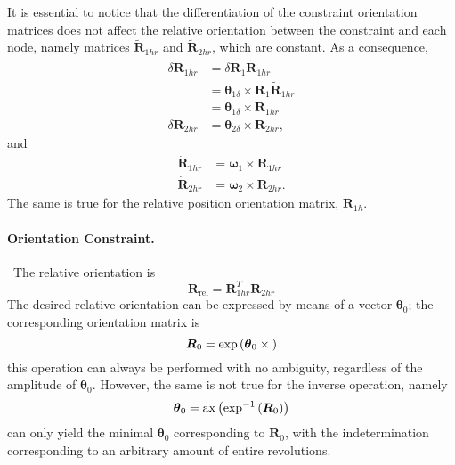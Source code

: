\documentclass[10pt,dvips,fleqn,subeqn]{report}
\newcommand{\T}[1]{\boldsymbol{#1}}
\begin{document}
It is essential to notice that the differentiation of the constraint
orientation matrices does not affect the relative orientation between
the constraint and each node, namely matrices $\tilde{\T{R}}_{1hr}$
and $\tilde{\T{R}}_{2hr}$, which are constant.
As a consequence,
\begin{align}
	\delta\T{R}_{1hr}
		&= \delta\T{R}_1 \tilde{\T{R}}_{1hr} \nonumber \\
		&= \T{\theta}_{1\delta} \times \T{R}_1 \tilde{\T{R}}_{1hr} \nonumber \\
		&= \T{\theta}_{1\delta}\times \T{R}_{1hr} \\
	\delta\T{R}_{2hr} &= \T{\theta}_{2\delta}\times \T{R}_{2hr} ,
\end{align}
and
\begin{align}
	\dot{\T{R}}_{1hr} &= \T{\omega}_1 \times \T{R}_{1hr} \\
	\dot{\T{R}}_{2hr} &= \T{\omega}_2 \times \T{R}_{2hr} .
\end{align}
The same is true for the relative position orientation matrix,
$\T{R}_{1h}$.


\paragraph{Orientation Constraint.} \
The relative orientation is
\begin{equation}
	\T{R}_{\mathrm{rel}} = \T{R}_{1hr}^T \T{R}_{2hr}
\end{equation}
The desired relative orientation can be expressed by means of a vector 
$\T{\theta}_0$; the corresponding orientation matrix is
\begin{equation}
	\T{R}_0 = \exp\plbr{\T{\theta}_0\times{}}
\end{equation}
this operation can always be performed with no ambiguity,
regardless of the amplitude of $\T{\theta}_0$.
However, the same is not true for the inverse operation, namely
\begin{equation}
	\T{\theta}_0 = \mathrm{ax}\plbr{\exp^{-1}\plbr{\T{R}_0}}
\end{equation}
can only yield the minimal $\T{\theta}_0$ corresponding to $\T{R}_0$,
with the indetermination corresponding to an arbitrary amount 
of entire revolutions.
\end{document}
